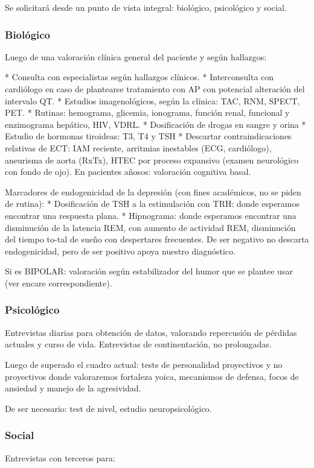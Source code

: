 Se solicitará desde un punto de vista integral: biológico, psicológico y social.
\subsubsection*{Biológico}
Luego de una valoración clínica general del paciente y según hallazgos:

* Consulta con especialistas según hallazgos clínicos.
* Interconsulta con cardiólogo en caso de plantearse tratamiento con AP con potencial alteración del intervalo QT.
* Estudios imagenológicos, según la clínica: TAC, RNM, SPECT, PET.
* Rutinas: hemograma, glicemia, ionograma, función renal, funcional y enzimograma hepático, HIV, VDRL.
* Dosificación de drogas en sangre y orina
* Estudio de hormonas tiroideas: T3, T4 y TSH
* Descartar contraindicaciones relativas de ECT: IAM reciente, arritmias inestables (ECG, cardiólogo), aneurisma de aorta (RxTx), HTEC por proceso expansivo (examen neurológico con fondo de ojo). En pacientes añosos: valoración cognitiva basal.

Marcadores de endogenicidad de la depresión (con fines académicos, no se piden de rutina):
* Dosificación de TSH a la estimulación con TRH: donde esperamos encontrar una respuesta plana.
* Hipnograma: donde esperamos encontrar una disminución de la latencia REM, con aumento de actividad REM, disminución del tiempo to-tal de sueño con despertares frecuentes. De ser negativo no descarta endogenicidad, pero de ser positivo apoya nuestro diagnóstico.

Si es BIPOLAR: valoración según estabilizador del humor que se plantee usar (ver encare correspondiente).
\subsubsection*{Psicológico}
Entrevistas diarias para obtención de datos, valorando repercusión de pérdidas actuales y curso de vida. Entrevistas de continentación, no prolongadas.

Luego de superado el cuadro actual: tests de personalidad proyectivos y no proyectivos donde valoraremos fortaleza yoica, mecanismos de defensa, focos de ansiedad y manejo de la agresividad.

De ser necesario: test de nivel, estudio neuropsicológico.
\subsubsection*{Social}
Entrevistas con terceros para:

